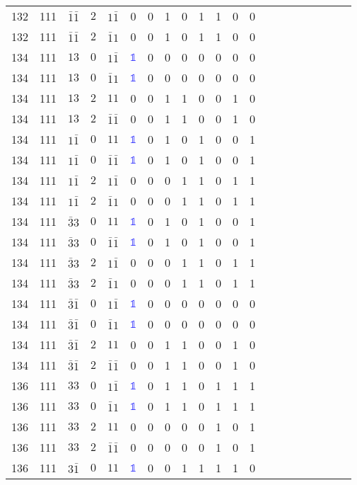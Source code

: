 \begin{longtable*}{c| cccccccccccccccccccc }
132& 111& $\bar{1}\bar{1}$& $2$& $1\bar{1}$& 0& 0& 1& 0& 1& 1& 0& 0\\
132& 111& $\bar{1}\bar{1}$& $2$& $\bar{1}1$& 0& 0& 1& 0& 1& 1& 0& 0\\
134& 111& $13$& $0$& $1\bar{1}$& \textcolor{blue}{$\mathds{1}$}& 0& 0& 0& 0& 0& 0& 0\\
134& 111& $13$& $0$& $\bar{1}1$& \textcolor{blue}{$\mathds{1}$}& 0& 0& 0& 0& 0& 0& 0\\
134& 111& $13$& $2$& $11$& 0& 0& 1& 1& 0& 0& 1& 0\\
134& 111& $13$& $2$& $\bar{1}\bar{1}$& 0& 0& 1& 1& 0& 0& 1& 0\\
134& 111& $1\bar{1}$& $0$& $11$& \textcolor{blue}{$\mathds{1}$}& 0& 1& 0& 1& 0& 0& 1\\
134& 111& $1\bar{1}$& $0$& $\bar{1}\bar{1}$& \textcolor{blue}{$\mathds{1}$}& 0& 1& 0& 1& 0& 0& 1\\
134& 111& $1\bar{1}$& $2$& $1\bar{1}$& 0& 0& 0& 1& 1& 0& 1& 1\\
134& 111& $1\bar{1}$& $2$& $\bar{1}1$& 0& 0& 0& 1& 1& 0& 1& 1\\
134& 111& $\bar{3}3$& $0$& $11$& \textcolor{blue}{$\mathds{1}$}& 0& 1& 0& 1& 0& 0& 1\\
134& 111& $\bar{3}3$& $0$& $\bar{1}\bar{1}$& \textcolor{blue}{$\mathds{1}$}& 0& 1& 0& 1& 0& 0& 1\\
134& 111& $\bar{3}3$& $2$& $1\bar{1}$& 0& 0& 0& 1& 1& 0& 1& 1\\
134& 111& $\bar{3}3$& $2$& $\bar{1}1$& 0& 0& 0& 1& 1& 0& 1& 1\\
134& 111& $\bar{3}\bar{1}$& $0$& $1\bar{1}$& \textcolor{blue}{$\mathds{1}$}& 0& 0& 0& 0& 0& 0& 0\\
134& 111& $\bar{3}\bar{1}$& $0$& $\bar{1}1$& \textcolor{blue}{$\mathds{1}$}& 0& 0& 0& 0& 0& 0& 0\\
134& 111& $\bar{3}\bar{1}$& $2$& $11$& 0& 0& 1& 1& 0& 0& 1& 0\\
134& 111& $\bar{3}\bar{1}$& $2$& $\bar{1}\bar{1}$& 0& 0& 1& 1& 0& 0& 1& 0\\
136& 111& $33$& $0$& $1\bar{1}$& \textcolor{blue}{$\mathds{1}$}& 0& 1& 1& 0& 1& 1& 1\\
136& 111& $33$& $0$& $\bar{1}1$& \textcolor{blue}{$\mathds{1}$}& 0& 1& 1& 0& 1& 1& 1\\
136& 111& $33$& $2$& $11$& 0& 0& 0& 0& 0& 1& 0& 1\\
136& 111& $33$& $2$& $\bar{1}\bar{1}$& 0& 0& 0& 0& 0& 1& 0& 1\\
136& 111& $3\bar{1}$& $0$& $11$& \textcolor{blue}{$\mathds{1}$}& 0& 0& 1& 1& 1& 1& 0\\

\end{longtable*}
